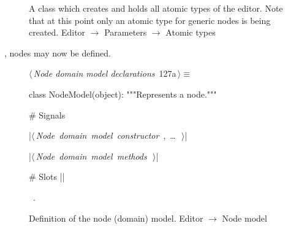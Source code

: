 \documentclass[%
    a4paper,    %
    justified,  %
    nobib,      %
    openany     %
]{tufte-book}
\makeatletter
\renewcommand{\label}[1]{\@tufte@label{##1}}%
\makeatother
\begin{document}
\begin{figure}[!htbp]
\begin{flushleft}
\begin{minipage}{\linewidth}
\begin{list}{}{\setlength{\itemsep}{-\parsep}\setlength{\itemindent}{-\leftmargin}}
\item{}
\end{list}
\end{minipage}\vspace{4ex}
\end{flushleft}
\caption{A class which creates and holds all atomic types of the editor. Note
  that at this point only an atomic type for generic nodes is being created.
  \newline{}\newline{}Editor $\rightarrow$ Parameters $\rightarrow$ Atomic types}
\end{figure}

, nodes may now be defined.

\begin{figure}[!htbp]
\begin{flushleft} \small
\begin{minipage}{\linewidth}\label{scrap65}\raggedright\small
{} $\langle\,${\itshape Node domain model declarations}\nobreak\ {\footnotesize {127a}}$\,\rangle\equiv$
\vspace{-1ex}
\begin{pythoncode}
class NodeModel(object):
    """Represents a node."""

    # Signals

    |\hbox{$\langle\,${\itshape Node domain model constructor}\nobreak\ {\footnotesize {}, \ldots\ }$\,\rangle$}|

    |\hbox{$\langle\,${\itshape Node domain model methods}\nobreak\ {\footnotesize {}}$\,\rangle$}|

    # Slots
|\NWsep|
\end{pythoncode}
\vspace{1.5ex}
\footnotesize
\begin{list}{}{\setlength{\itemsep}{-\parsep}\setlength{\itemindent}{-\leftmargin}}
\item \NWtxtMacroRefIn\ .

\item{}
\end{list}
\end{minipage}\vspace{4ex}
\end{flushleft}
\caption{Definition of the node (domain) model.
  \newline{}\newline{}Editor $\rightarrow$ Node model}
\end{figure}
\end{document}
